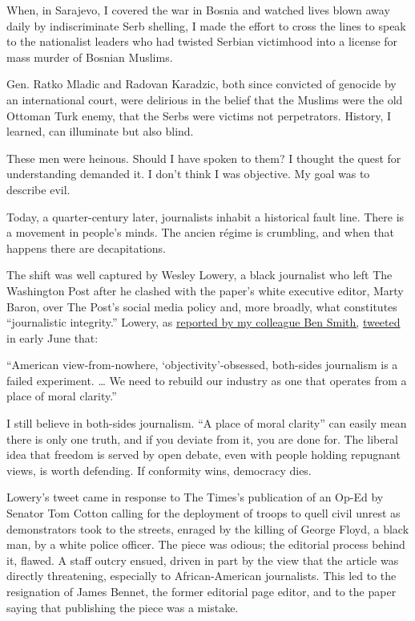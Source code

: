When, in Sarajevo, I covered the war in Bosnia and watched lives blown
away daily by indiscriminate Serb shelling, I made the effort to cross
the lines to speak to the nationalist leaders who had twisted Serbian
victimhood into a license for mass murder of Bosnian Muslims.

Gen. Ratko Mladic and Radovan Karadzic, both since convicted of genocide
by an international court, were delirious in the belief that the Muslims
were the old Ottoman Turk enemy, that the Serbs were victims not
perpetrators. History, I learned, can illuminate but also blind.

These men were heinous. Should I have spoken to them? I thought the
quest for understanding demanded it. I don't think I was objective. My
goal was to describe evil.

Today, a quarter-century later, journalists inhabit a historical fault
line. There is a movement in people's minds. The ancien régime is
crumbling, and when that happens there are decapitations.

The shift was well captured by Wesley Lowery, a black journalist who
left The Washington Post after he clashed with the paper's white
executive editor, Marty Baron, over The Post's social media policy and,
more broadly, what constitutes ``journalistic integrity.'' Lowery, as
\href{https://www.nytimes3xbfgragh.onion/2020/06/07/business/media/new-york-times-washington-post-protests.html}{reported
by my colleague Ben Smith,}
\href{https://twitter.com/WesleyLowery/status/1268366363359354885}{tweeted}
in early June that:

``American view-from-nowhere, `objectivity'-obsessed, both-sides
journalism is a failed experiment. \ldots{} We need to rebuild our
industry as one that operates from a place of moral clarity.''

I still believe in both-sides journalism. ``A place of moral clarity''
can easily mean there is only one truth, and if you deviate from it, you
are done for. The liberal idea that freedom is served by open debate,
even with people holding repugnant views, is worth defending. If
conformity wins, democracy dies.

Lowery's tweet came in response to The Times's publication of an Op-Ed
by Senator Tom Cotton calling for the deployment of troops to quell
civil unrest as demonstrators took to the streets, enraged by the
killing of George Floyd, a black man, by a white police officer. The
piece was odious; the editorial process behind it, flawed. A staff
outcry ensued, driven in part by the view that the article was directly
threatening, especially to African-American journalists. This led to the
resignation of James Bennet, the former editorial page editor, and to
the paper saying that publishing the piece was a mistake.

